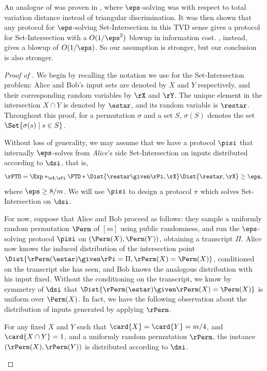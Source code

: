 An analogue of  was proven in
\cite{AssadiR20}, where $\eps$-solving was with respect to total variation
distance instead of triangular discrimination.
It was then shown that any protocol for $\eps$-solving Set-Intersection in this
TVD sense gives a protocol for Set-Intersection with a $O(1/\eps^2)$
blowup in information cost.
, instead, gives a blowup of $O(1/\eps)$.
So our assumption is stronger, but our conclusion is also stronger.

\begin{proof}[Proof of ]
We begin by recalling the notation we use for the Set-Intersection problem:
Alice and Bob's input sets are
denoted by $X$ and $Y$ respectively, and their corresponding random variables
by $\rX$ and $\rY$.
The unique element in the intersection $X \cap Y$ is denoted by $\estar$,
and its random variable is $\restar$.
Throughout this proof, for a permutation $\sigma$ and a set $S$,
$\sigma(S)$ denotes the set $\Set{ \sigma(s) \mid s \in S }$.

\noindent
Without loss of generality, we may assume that we have a protocol $\pisi$ that
internally $\eps$-solves from \emph{Alice}'s side
Set-Intersection on inputs distributed according to $\dsi$, that is,
\[
  \rPTD = 
  \Exp*_{\rX, \rPi}{
     \PTD*{ \Dist{ \restar \given \rPi, \rX}}
     {\Dist{ \restar, \rX}}
  } \geq \eps,
\]
where $\eps \geq 8 / m$.
We will use $\pisi$ to design a protocol $\pi$ which solves Set-Intersection
on $\dsi$.

For now, suppose that Alice and Bob proceed as follows: they sample a uniformly
random permutation $\Perm$ of $[m]$ using public randomness, and run the
$\eps$-solving protocol $\pisi$ on $(\Perm(X), \Perm(Y))$, obtaining a
transcript $\Pi$.
Alice now knows the induced distribution of the intersection
point $\Dist{\rPerm(\estar) \given \rPi = \Pi, \rPerm(X) = \Perm(X)}$, conditioned
on the transcript she has seen, and Bob knows the analogous distribution with
his input fixed.
Without the conditioning on the transcript, we know by symmetry of $\dsi$ that
$\Dist{\rPerm(\estar) \given \rPerm(X) = \Perm(X)}$ is uniform over $\Perm(X)$.
In fact, we have the following observation about the distribution of inputs
generated by applying $\rPerm$.

\begin{observation}\label{obsv:dsi}
  For any fixed $X$ and $Y$ such that $\card{X} = \card{Y} = m / 4$, and
  $\card{X \cap Y} = 1$,
  and a uniformly random permutation $\rPerm$,
  the instance $(\rPerm(X), \rPerm(Y))$ is distributed according to $\dsi$.
\end{observation}


\end{proof}
